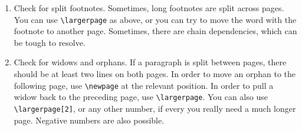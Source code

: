 \begin{enumerate}
\texttt{[b]}ottom of page,
separate \texttt{[p]}age. You can use several of these options, e.g. \verb+\begin{figure}[ht]+ to place a figure either exactly where it is in the document or on the top of this page or another page.  A figure should generally appear as close to the text which refers to it, either on the same page or a following page. If the figure is on a following page, it is preferable that the reader does not have to turn the page. Next to the parameters \verb+[hbpt]+, you can also change the position of the relevant lines of source code to ``move'' a figure to the top or bottom of another page of the pdf. Finally, you can also slightly change the size of the figure or table to be able to fit it on the desired page.
                                                                            
\item Check for split footnotes. Sometimes, long footnotes are split across pages. You can use \verb+\largerpage+ as above, or you can try to move the word with the footnote to another page. Sometimes, there are chain dependencies, which can be tough to resolve.


\item Check for widows and orphans. If a paragraph is split between pages, there should be at least two lines on both pages. In order to move  an orphan to the following page, use \verb+\newpage+ at the relevant position. In order to pull a widow back to the preceding page, use \verb+\largerpage+. You can also use \verb+\largerpage[2]+, or any other number, if every you really need a much longer page. Negative numbers are also possible. 

\end{enumerate} 

